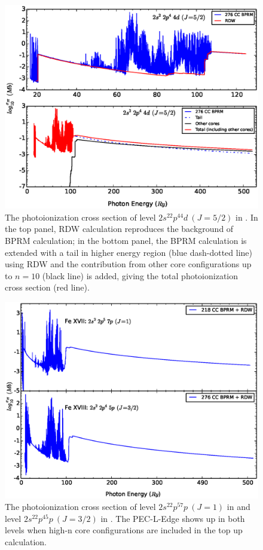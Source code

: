 \begin{figure}
	\centering
	\includegraphics[width=\textwidth]{figures_5/fe18_5_0_20}	
	\caption{The photoionization cross section of level $2s^22p^44d~(J=5/2)$ in . In the top panel, RDW calculation reproduces the background of BPRM calculation; in the bottom panel, the BPRM calculation is extended with a tail in higher energy region (blue dash-dotted line) using RDW and the contribution from other core configurations up to $n=10$ (black line) is added, giving the total photoionization cross section (red line).}
	\label{fig_fe18_5_0_20}
\end{figure}

\begin{figure}
	\centering
	\includegraphics[width=\textwidth]{figures_5/fe17_fe18_other_jumps}	
	\caption{The photoionization cross section of level $2s^22p^57p~(J=1)$ in  and level $2s^22p^45p~(J=3/2)$ in . The PEC-L-Edge shows up in both levels when high-n core configurations are included in the top up calculation.}
	\label{fig_fe17_fe18_other_jump}
\end{figure}

